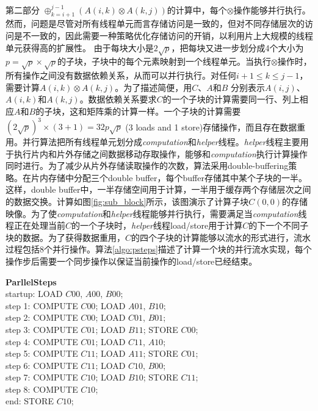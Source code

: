 \begin{flushleft}
第二部分 $\oplus_{k=i+1}^{j-1}(A(i,k)\otimes A(k,j))$的计算中，每个$\otimes$操作能够并行执行。然而，问题是尽管对所有线程单元而言存储访问是一致的，但对不同存储层次的访问是不一致的，因此需要一种策略优化存储访问的开销，以利用片上大规模的线程单元获得高的扩展性。
由于每块大小是$2\sqrt{p}$，把每块又进一步划分成4个大小为$p=\sqrt{p}\times\sqrt{p}$的子块，子块中的每个元素映射到一个线程单元。当执行$\otimes$操作时，所有操作之间没有数据依赖关系，从而可以并行执行。对任何$i+1 \le k \le j-1$，需要计算$A(i,k)\otimes A(k,j)$。为了描述简便，用$C$、$A$和$B$ 分别表示$A(i, j)$、$A(i, k)$和$A(k, j)$。数据依赖关系要求$C$的一个子块的计算需要同一行、列上相应$A$和$B$的子块，这和矩阵乘的计算一样。一个子块的计算需要$(2\sqrt{p})^{3}\times(3+1)=32p\sqrt{p}$ (3 loads and 1 store)存储操作，而且存在数据重用。并行算法把所有线程单元划分成{\em computation}和{\em helper}线程。{\em helper}线程主要用于执行片内和片外存储之间数据移动存取操作，能够和{\em computation}执行计算操作同时进行。为了减少从片外存储读取操作的次数，算法采用double-buffering策略。在片内存储中分配三个double buffer，每个buffer存储其中某个子块的一半。这样，double buffer中，一半存储空间用于计算，一半用于缓存两个存储层次之间的数据交换。计算如图\ref{fig:sub_block}所示，该图演示了计算子块$C(0,0)$的存储映像。为了使{\em computation}和{\em helper}线程能够并行执行，需要满足当{\em computation}线程正在处理当前$C$的一个子块时，{\em helper}线程load/store用于计算$C$的下一个不同子块的数据。为了获得数据重用，$C$的四个子块的计算能够以流水的形式进行，流水过程包括8个并行操作。算法\ref{algo:psteps}描述了计算一个块的并行流水实现，每个操作步后需要一个同步操作以保证当前操作的load/store已经结束。

\begin{algorithm}\label{algo:psteps}
	{\bf ParllelSteps}\\
	startup: LOAD $C00$, $A00$, $B00$; \\
	step 1: COMPUTE $C00$; LOAD $A01$, $B10$;\\
	step 2: COMPUTE $C00$; LOAD $C01$, $B01$;\\
	step 3: COMPUTE $C01$; LOAD $B11$; STORE $C00$;\\
	step 4: COMPUTE $C01$; LOAD $C11$, $A10$;\\
	step 5: COMPUTE $C11$; LOAD $A11$; STORE $C01$;\\
	step 6: COMPUTE $C11$; LOAD $C10$, $B00$;\\
	step 7: COMPUTE $C10$; LOAD $B10$; STORE $C11$;\\
	step 8: COMPUTE $C10$; \\
	end: STORE $C10$;
\end{algorithm}


\end{flushleft}
